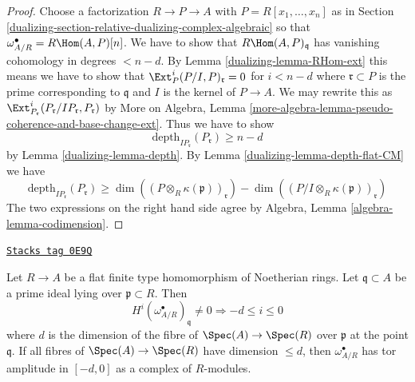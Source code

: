 \begin{proof}

Choose a factorization $R \to P \to A$ with $P = R[x_1, \ldots, x_n]$
as in Section \ref{dualizing-section-relative-dualizing-complex-algebraic}
so that $\omega_{A/R}^\bullet = R\Hom(A, P)[n]$.
We have to show that $R\Hom(A, P)_\mathfrak q$
has vanishing cohomology in degrees $< n - d$.
By Lemma \ref{dualizing-lemma-RHom-ext} this means we have to
show that $\Ext_P^i(P/I, P)_{\mathfrak r} = 0$ for $i < n - d$
where $\mathfrak r \subset P$ is the prime corresponding to $\mathfrak q$
and $I$ is the kernel of $P \to A$.
We may rewrite this as
$\Ext_{P_\mathfrak r}^i(P_\mathfrak r/IP_\mathfrak r, P_\mathfrak r)$
by More on Algebra, Lemma
\ref{more-algebra-lemma-pseudo-coherence-and-base-change-ext}.
Thus we have to show
$$
\text{depth}_{IP_\mathfrak r}(P_\mathfrak r) \geq n - d
$$
by Lemma \ref{dualizing-lemma-depth}.
By Lemma \ref{dualizing-lemma-depth-flat-CM} we have
$$
\text{depth}_{IP_\mathfrak r}(P_\mathfrak r) \geq
\dim((P \otimes_R \kappa(\mathfrak p))_\mathfrak r) -
\dim((P/I \otimes_R \kappa(\mathfrak p))_\mathfrak r)
$$
The two expressions on the right hand side agree by
Algebra, Lemma \ref{algebra-lemma-codimension}.
\end{proof}

\begin{lemma}
\label{dualizing-lemma-relative-dualizing-flat-vanishing}
\href{https://stacks.math.columbia.edu/tag/0E9Q}{\texttt{Stacks tag 0E9Q}}

Let $R \to A$ be a flat finite type homomorphism of Noetherian rings.
Let $\mathfrak q \subset A$ be a prime ideal lying over
$\mathfrak p \subset R$. Then
$$
H^i(\omega_{A/R}^\bullet)_\mathfrak q \not = 0
\Rightarrow - d \leq i \leq 0
$$
where $d$ is the dimension of the fibre of $\Spec(A) \to \Spec(R)$
over $\mathfrak p$ at the point $\mathfrak q$. If all fibres of
$\Spec(A) \to \Spec(R)$ have dimension $\leq d$, then
$\omega_{A/R}^\bullet$ has tor amplitude in $[-d, 0]$
as a complex of $R$-modules.
\end{lemma}

